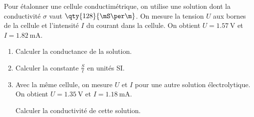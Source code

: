 Pour étalonner une cellule conductimétrique, on utilise une solution dont la
conductivité $\sigma$ vaut $\qty{128}{\mS\per\m}$. On mesure la
tension $U$ aux bornes de la cellule et l'intensité $I$ du courant dans la
cellule. On obtient $U=\qty{1.57}{\V}$ et $I=\qty{1.82}{\mA}$.
\begin{enumerate}
    \item Calculer la conductance de la solution.
    \item Calculer la constante $\frac{S}{\ell}$ en unités SI.
    \item Avec la même cellule, on mesure $U$ et $I$ pour une autre solution
          électrolytique. On obtient $U=\qty{1.35}{\V}$ et $I=\qty{1.18}{\mA}$.

          Calculer la conductivité de cette solution.
\end{enumerate}

